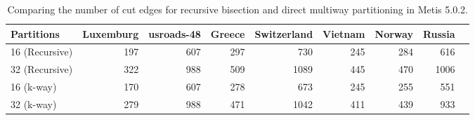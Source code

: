 \documentclass[unicode,11pt,a4paper,oneside,numbers=endperiod,openany]{scrartcl}
\begin{document}
\begin{table}[h]
\caption{Comparing the number of cut edges for recursive bisection and direct multiway partitioning in Metis 5.0.2.}
\centering
\begin{tabular}{|l|r|r|r|r|r|r|r|r} \hline\hline 
Partitions       &   Luxemburg           & usroads-48 &  Greece &  Switzerland &  Vietnam  &  Norway &  Russia  \\ \hline
 16 (Recursive)  &   197                 & 607        & 297     & 730          & 245       & 284     & 616      \\ 
 32 (Recursive)  &   322                 & 988        & 509     & 1089         & 445       & 470     & 1006     \\        
 16 (k-way)      &   170                 & 607        & 278     & 673          & 245       & 255     & 551      \\
 32 (k-way)      &   279                 & 988        & 471     & 1042         & 411       & 439     & 933      \\ \hline \hline
\end{tabular}              
\label{table:Compare_Metis}
\end{table}
\end{document}
